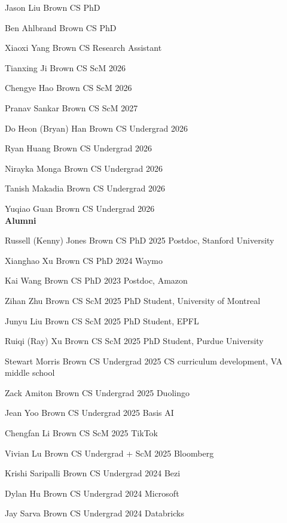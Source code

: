 \documentclass[line,margin]{res}
\begin{document}
\begin{resume}
\currentphd
{Jason Liu}
{Brown CS PhD}

\currentphd
{Ben Ahlbrand}
{Brown CS PhD}

\currentphd
{Xiaoxi Yang}
{Brown CS Research Assistant}

\student
{Tianxing Ji}
{Brown CS ScM}
{2026}

\student
{Chengye Hao}
{Brown CS ScM}
{2026}

\student
{Pranav Sankar}
{Brown CS ScM}
{2027}

\student
{Do Heon (Bryan) Han}
{Brown CS Undergrad}
{2026}

\student
{Ryan Huang}
{Brown CS Undergrad}
{2026}

\student
{Nirayka Monga}
{Brown CS Undergrad}
{2026}

\student
{Tanish Makadia}
{Brown CS Undergrad}
{2026}

\student
{Yuqiao Guan}
{Brown CS Undergrad}
{2026}
\\


\textbf{Alumni}

\alumni
{Russell (Kenny) Jones}
{Brown CS PhD}
{2025}
{Postdoc, Stanford University}

\alumni
{Xianghao Xu}
{Brown CS PhD}
{2024}
{Waymo}

\alumni
{Kai Wang}
{Brown CS PhD}
{2023}
{Postdoc, Amazon}

\alumni
{Zihan Zhu}
{Brown CS ScM}
{2025}
{PhD Student, University of Montreal}

\alumni
{Junyu Liu}
{Brown CS ScM}
{2025}
{PhD Student, EPFL}

\alumni
{Ruiqi (Ray) Xu}
{Brown CS ScM}
{2025}
{PhD Student, Purdue University}

\alumni
{Stewart Morris}
{Brown CS Undergrad}
{2025}
{CS curriculum development, VA middle school}

\alumni
{Zack Amiton}
{Brown CS Undergrad}
{2025}
{Duolingo}

\alumni
{Jean Yoo}
{Brown CS Undergrad}
{2025}
{Basis AI}

\alumni
{Chengfan Li}
{Brown CS ScM}
{2025}
{TikTok}

\alumni
{Vivian Lu}
{Brown CS Undergrad + ScM}
{2025}
{Bloomberg}

\alumni
{Krishi Saripalli}
{Brown CS Undergrad}
{2024}
{Bezi}

\alumni
{Dylan Hu}
{Brown CS Undergrad}
{2024}
{Microsoft}

\alumni
{Jay Sarva}
{Brown CS Undergrad}
{2024}
{Databricks}


\end{resume}
\end{document}
